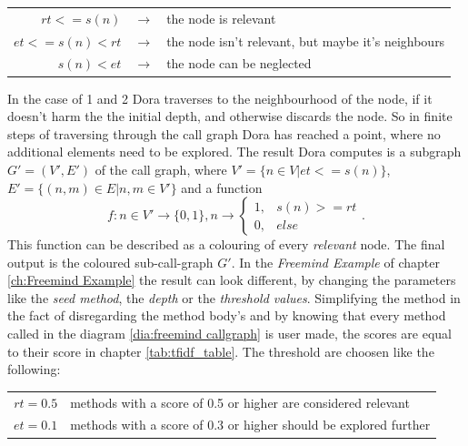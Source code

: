 \vspace{2em} %
\begin{table}[h]
	\centering
	\begin{tabular}{r c l}
		$rt <= s(n)$ & $\rightarrow$ & the node is relevant\\
		$et <= s(n) < rt$ & $\rightarrow$ & the node isn't relevant, but maybe it's neighbours \\
		$s(n) < et$ & $\rightarrow$ & the node can be neglected
	\end{tabular}
\end{table}

In the case of 1 and 2 Dora traverses to the neighbourhood of the node, if it doesn't harm the the initial depth, and otherwise discards the node. So in finite steps of traversing through the call graph Dora has reached a point, where no additional elements need to be explored.\newline
The result Dora computes is a subgraph $G'=(V',E')$ of the call graph, where $V' = \{ n \in V | et <= s(n) \}$, $E' = \{ (n,m) \in E | n,m \in V' \}$ and a function \newline
\[
	f: n\in V' \rightarrow \{0,1\},n \rightarrow 
		\left\{
			\begin{array}{ll} 
				1, & s(n) >= rt \\
				0, & else 
			\end{array}\right. .
\]
This function can be described as a colouring of every \textit{relevant} node. The final output is the coloured sub-call-graph $G'$. \newline
\emptyLine
In the \textit{Freemind Example} of chapter \ref{ch:Freemind Example} the result can look different, by changing the parameters like the \textit{seed method}, the \textit{depth} or the \textit{threshold values}.
Simplifying the method in the fact of disregarding the method body's and by knowing that every method called in the diagram \ref{dia:freemind callgraph} is user made, the scores are equal to their score in chapter \ref{tab:tfidf_table}. \newline
The threshold are choosen like the following:
\begin{table}[h]
	\centering
	\begin{tabular}{r l}
		$rt = 0.5$ & methods with a score of 0.5 or higher are considered relevant \\
		$et = 0.1$ & methods with a score of 0.3 or higher should be explored further
	\end{tabular}
\end{table}
